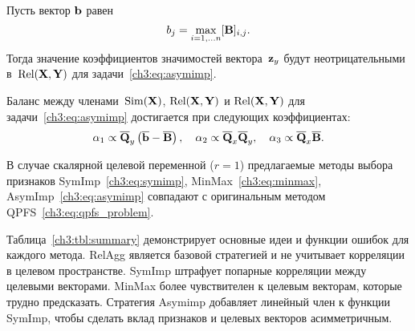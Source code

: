 \documentclass[11pt, a5paper]{dissert}
\begin{document}
\begin{statement}
	Пусть вектор $\mathbf{b}$ равен
	\begin{equation*}
	b_j = \max_{i=1, \dots n} [\mathbf{B}]_{i, j}.
	\end{equation*}
	Тогда значение коэффициентов значимостей вектора~$\mathbf{z}_y$ будут неотрицательными в~$\text{Rel}(\mathbf{X}, \mathbf{Y})$ для задачи~\eqref{ch3:eq:asymimp}.
\end{statement}

\begin{statement}
	Баланс между членами~$\text{Sim}(\mathbf{X})$, $\text{Rel}(\mathbf{X}, \mathbf{Y})$ и $\text{Rel}(\mathbf{X}, \mathbf{Y})$ для задачи~\eqref{ch3:eq:asymimp} достигается при следующих коэффициентах:
	\begin{equation*}
		\alpha_1 \propto \overline{\mathbf{Q}}_y \left( \overline{\mathbf{b}} - \overline{\mathbf{B}}\right), \quad
		\alpha_2 \propto \overline{\mathbf{Q}}_x \overline{\mathbf{Q}}_y, \quad
		\alpha_3  \propto \overline{\mathbf{Q}}_x \overline{\mathbf{B}}.
	\end{equation*}
\end{statement}

\begin{theorem}
	В случае скалярной целевой переменной ($r=1$) предлагаемые методы выбора признаков SymImp~\eqref{ch3:eq:symimp}, MinMax~\eqref{ch3:eq:minmax}, AsymImp~\eqref{ch3:eq:asymimp} совпадают с оригинальным методом QPFS~\eqref{ch3:eq:qpfs_problem}.
\end{theorem}

Таблица~\ref{ch3:tbl:summary} демонстрирует основные идеи и функции ошибок для каждого метода. 
RelAgg является базовой стратегией и не учитывает корреляции в целевом пространстве.
SymImp штрафует попарные корреляции между целевыми векторами.
MinMax более чувствителен к целевым векторам, которые трудно предсказать.
Стратегия Asymimp добавляет линейный член к функции SymImp, чтобы сделать вклад признаков и целевых векторов асимметричным.
\end{document}
